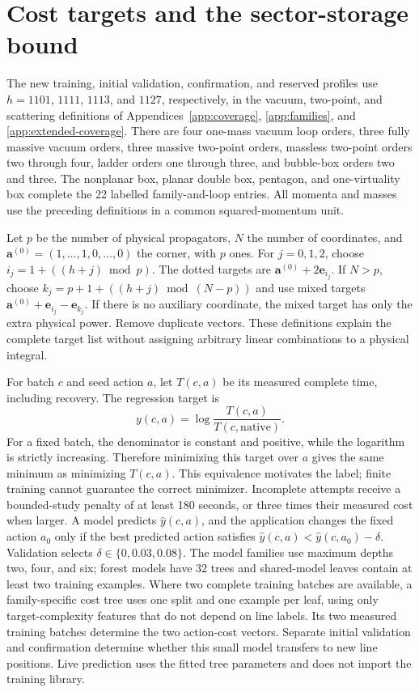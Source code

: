 \section{Cost targets and the sector-storage bound}
\label{app:family-cost}
The new training, initial validation, confirmation, and reserved profiles use $h=1101$, $1111$, $1113$, and $1127$, respectively, in the vacuum, two-point, and scattering definitions of Appendices~\ref{app:coverage}, \ref{app:families}, and \ref{app:extended-coverage}. There are four one-mass vacuum loop orders, three fully massive vacuum orders, three massive two-point orders, massless two-point orders two through four, ladder orders one through three, and bubble-box orders two and three. The nonplanar box, planar double box, pentagon, and one-virtuality box complete the 22 labelled family-and-loop entries. All momenta and masses use the preceding definitions in a common squared-momentum unit.

Let $p$ be the number of physical propagators, $N$ the number of coordinates, and $\boldsymbol a^{(0)}=(1,\ldots,1,0,\ldots,0)$ the corner, with $p$ ones. For $j=0,1,2$, choose $i_j=1+((h+j)\bmod p)$. The dotted targets are $\boldsymbol a^{(0)}+2\boldsymbol e_{i_j}$. If $N>p$, choose $k_j=p+1+((h+j)\bmod(N-p))$ and use mixed targets $\boldsymbol a^{(0)}+\boldsymbol e_{i_j}-\boldsymbol e_{k_j}$. If there is no auxiliary coordinate, the mixed target has only the extra physical power. Remove duplicate vectors. These definitions explain the complete target list without assigning arbitrary linear combinations to a physical integral.

For batch $c$ and seed action $a$, let $T(c,a)$ be its measured complete time, including recovery. The regression target is
\begin{equation}
 y(c,a)=\log\frac{T(c,a)}{T(c,\mathrm{native})}.
 \label{eq:family-cost-label}
\end{equation}
For a fixed batch, the denominator is constant and positive, while the logarithm is strictly increasing. Therefore minimizing this target over $a$ gives the same minimum as minimizing $T(c,a)$. This equivalence motivates the label; finite training cannot guarantee the correct minimizer. Incomplete attempts receive a bounded-study penalty of at least 180 seconds, or three times their measured cost when larger. A model predicts $\widehat y(c,a)$, and the application changes the fixed action $a_0$ only if the best predicted action satisfies $\widehat y(c,a)<\widehat y(c,a_0)-\delta$. Validation selects $\delta\in\{0,0.03,0.08\}$. The model families use maximum depths two, four, and six; forest models have 32 trees and shared-model leaves contain at least two training examples. Where two complete training batches are available, a family-specific cost tree uses one split and one example per leaf, using only target-complexity features that do not depend on line labels. Its two measured training batches determine the two action-cost vectors. Separate initial validation and confirmation determine whether this small model transfers to new line positions. Live prediction uses the fitted tree parameters and does not import the training library.

